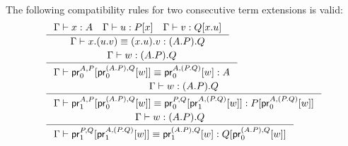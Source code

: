\begin{lem}
The following compatibility rules for two consecutive term extensions is valid:
\begin{align*}
& \inference
  {\jterm{\Gamma}{A}{x}
   \jterm{\Gamma}{\subst{x}{P}}{u}
   \jterm{\Gamma}{\subst{\ctxext{x}{u}}{Q}}{v}}
  {\jtermeq{\Gamma}{\ctxext{{A}{P}}{Q}}{\ctxext{x}{{u}{v}}}{\ctxext{{x}{u}}{v}}}\\
& \inference
  {\jterm{\Gamma}{\ctxext{{A}{P}}{Q}}{w}}
  {\jtermeq{\Gamma}{A}{\cprojfst{A}{P}{\cprojfst{\ctxext{A}{P}}{Q}{w}}}{\cprojfst{A}{\ctxext{P}{Q}}{w}}}\\
& \inference
  {\jterm{\Gamma}{\ctxext{{A}{P}}{Q}}{w}}
  {\jtermeq{\Gamma}{\subst{\cprojfst{A}{\ctxext{P}{Q}}{w}}{P}}
    {\cprojsnd{A}{P}{\cprojfst{\ctxext{A}{P}}{Q}{w}}}
    {\cprojfst{P}{Q}{\cprojsnd{A}{\ctxext{P}{Q}}{w}}}}\\
& \inference
  {\jterm{\Gamma}{\ctxext{{A}{P}}{Q}}{w}}
  {\jtermeq{\Gamma}{\subst{\cprojfst{\ctxext{A}{P}}{Q}{w}}{Q}}
    {\cprojsnd{P}{Q}{\cprojsnd{A}{\ctxext{P}{Q}}{w}}}
    {\cprojsnd{\ctxext{A}{P}}{Q}{w}}}
\end{align*}
\end{lem}

